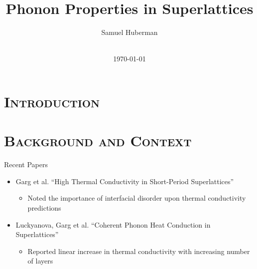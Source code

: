 \documentclass{beamer}
\begin{document}
\section{\scshape Introduction}
\begin{frame}
\title{Phonon Properties in Superlattices}
\author{
	Samuel Huberman\\
}
\date{
	\\
	\vspace{1cm}
	\today
}
\titlepage
\end{frame}

\section{\scshape Background and Context}
\begin{frame}{Recent Papers}
\begin{itemize}
\item Garg et al. ``High Thermal Conductivity in Short-Period Superlattices''
\begin{itemize}
\item Noted the importance of interfacial disorder upon thermal conductivity predictions
\end{itemize}
\vspace{0.5cm}
\item Luckyanova, Garg et al. ``Coherent Phonon Heat Conduction in Superlattices'' 
\begin{itemize}
\item Reported linear increase in thermal conductivity with increasing number of layers
\end{itemize}
\end{itemize}
\end{frame}

\end{document}
